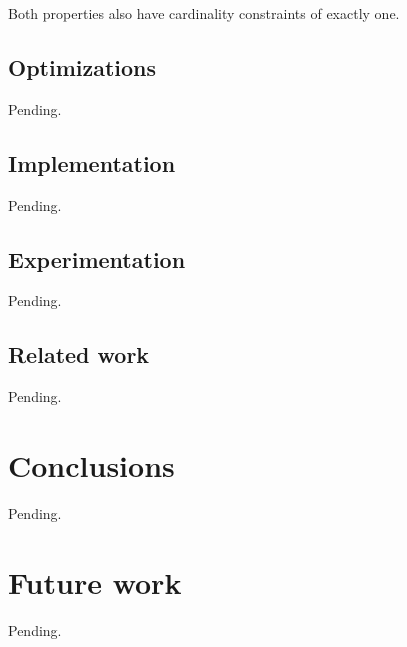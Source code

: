 \documentclass[a4paper, 10pt]{article}
\begin{document}
Both properties also have cardinality constraints of exactly one.


\subsection{Optimizations}

Pending.


\subsection{Implementation}

Pending.


\subsection{Experimentation}

Pending.


\subsection{Related work}

Pending.


\section{Conclusions}

Pending.


\section{Future work}

Pending.


%
%
\end{document}
